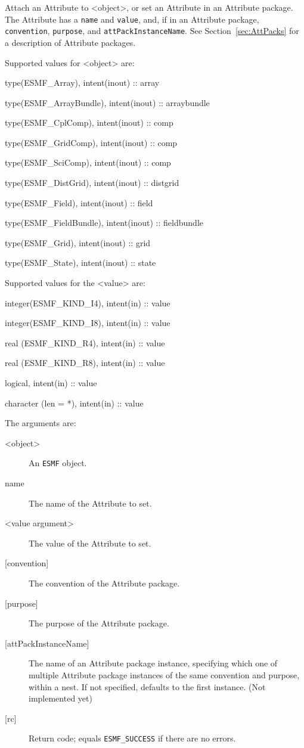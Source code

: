    Attach an Attribute to <object>, or set an Attribute in an
   Attribute package. The Attribute has a {\tt name} and {\tt value},
   and, if in an Attribute package, {\tt convention}, {\tt purpose}, and
   {\tt attPackInstanceName}.
   See Section~\ref{sec:AttPacks} for a description of Attribute packages.
  
   Supported values for <object> are:
   \begin{description}
   \item type(ESMF\_Array), intent(inout) :: array
   \item type(ESMF\_ArrayBundle), intent(inout) :: arraybundle
   \item type(ESMF\_CplComp), intent(inout) :: comp
   \item type(ESMF\_GridComp), intent(inout) :: comp
   \item type(ESMF\_SciComp), intent(inout) :: comp
   \item type(ESMF\_DistGrid), intent(inout) :: distgrid
   \item type(ESMF\_Field), intent(inout) :: field
   \item type(ESMF\_FieldBundle), intent(inout) :: fieldbundle
   \item type(ESMF\_Grid), intent(inout) :: grid
   \item type(ESMF\_State), intent(inout) :: state
   \end{description}
  
   Supported values for the <value> are:
   \begin{description}
   \item integer(ESMF\_KIND\_I4), intent(in) :: value
   \item integer(ESMF\_KIND\_I8), intent(in) :: value
   \item real (ESMF\_KIND\_R4), intent(in) :: value
   \item real (ESMF\_KIND\_R8), intent(in) :: value
   \item logical, intent(in) :: value
   \item character (len = *), intent(in) :: value
   \end{description}
  
   The arguments are:
   \begin{description}
   \item [<object>]
   An {\tt ESMF} object.
   \item [name]
   The name of the Attribute to set.
   \item [<value argument>]
   The value of the Attribute to set.
   \item [{[convention]}]
   The convention of the Attribute package.
   \item [{[purpose]}]
   The purpose of the Attribute package.
   \item [{[attPackInstanceName]}]
   The name of an Attribute package instance, specifying which one
   of multiple Attribute package instances of the same convention
   and purpose, within a nest. If not specified, defaults to the
   first instance. (Not implemented yet)
   \item [{[rc]}]
   Return code; equals {\tt ESMF\_SUCCESS} if there are no errors.
   \end{description}
  
